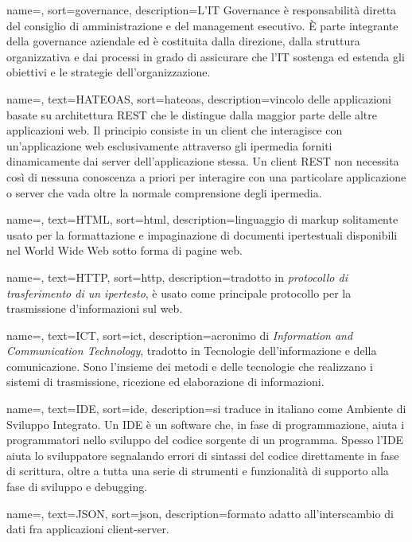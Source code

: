 {
	name=,
	sort=governance,
	description={L'IT Governance è responsabilità diretta del consiglio di amministrazione e del management esecutivo. \`{E} parte integrante della governance aziendale ed è costituita dalla direzione, dalla struttura organizzativa e dai processi in grado di assicurare che l'IT sostenga ed estenda gli obiettivi e le strategie dell'organizzazione.}
}

{
	name=,
	text=HATEOAS,
	sort=hateoas,
	description={vincolo delle applicazioni basate su architettura REST che le distingue dalla maggior parte delle altre applicazioni web. Il principio consiste in un client che interagisce con un'applicazione web esclusivamente attraverso gli ipermedia forniti dinamicamente dai server dell'applicazione stessa. Un client REST non necessita così di nessuna conoscenza a priori per interagire con una particolare applicazione o server che vada oltre la normale comprensione degli ipermedia.}
}

{
	name=,
	text=HTML,
	sort=html,
	description={linguaggio di markup solitamente usato per la formattazione e impaginazione di documenti ipertestuali disponibili nel World Wide Web sotto forma di pagine web.}
}

{
	name=,
	text=HTTP,
	sort=http,
	description={tradotto in \emph{protocollo di trasferimento di un ipertesto}, è usato come principale protocollo per la trasmissione d'informazioni sul web.}
}

{
	name=,
	text=ICT,
	sort=ict,
	description={acronimo di \emph{Information and Communication Technology}, tradotto in Tecnologie dell’informazione e della comunicazione. Sono l'insieme dei metodi e delle tecnologie che realizzano i sistemi di trasmissione, ricezione ed elaborazione di informazioni.}
}

{
	name=,
	text=IDE,
	sort=ide,
	description={si traduce in italiano come Ambiente di Sviluppo Integrato. Un IDE è un software che, in fase di programmazione, aiuta i programmatori nello sviluppo del codice sorgente di un programma. Spesso l'IDE aiuta lo sviluppatore segnalando errori di sintassi del codice direttamente in fase di scrittura, oltre a tutta una serie di strumenti e funzionalità di supporto alla fase di sviluppo e debugging.}
}

{
	name=,
	text=JSON,
	sort=json,
	description={formato adatto all'interscambio di dati fra applicazioni client-server.}
}

